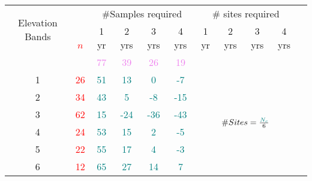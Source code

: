 \begin{table}\scriptsize
\centering
\begin{tabular}{cccccc|ccccc}
\toprule
\multirow{2}{1cm}{Elevation Bands}  & & \multicolumn{4}{c}{ \#Samples required} & \multicolumn{4}{c}{\# sites required} \\ \cline{3-10}\noalign{\smallskip}
 \multicolumn{1}{c}{}&\multirow{2}{.3cm}{\textcolor{red}{$n$}}& 1 yr   & 2 yrs  & 3 yrs     & 4 yrs   & 1 yr  & 2 yrs & 3 yrs  & 4 yrs \\ 
						&		           &\textcolor{violet}{77} &\textcolor{violet}{39} &\textcolor{violet}{26} &\textcolor{violet}{19}&&&&&\\ \midrule
1                                                                   &\textcolor{red}{26}&    \textcolor{teal}{51}   & \textcolor{teal}{13}       & \textcolor{teal}{0}        & \textcolor{teal}{-7}                         & \multicolumn{4}{c}{\multirow{6}{*}{\large$\#Sites = {\textcolor{teal}{N_c} \over 6}$}}  \\ 
2                                                                      &\textcolor{red}{34}& \textcolor{teal}{43} & \textcolor{teal}{5} & \textcolor{teal}{-8}     & \textcolor{teal}{-15}                                    &\multicolumn{4}{c}{}    \\ 
3                                                                      &\textcolor{red}{62}&  \textcolor{teal}{15} & \textcolor{teal}{-24}  & \textcolor{teal}{-36} &\textcolor{teal}{ -43}                                  & \multicolumn{4}{c}{}   \\
4                                                                      &\textcolor{red}{24}&  \textcolor{teal}{53} & \textcolor{teal}{15} & \textcolor{teal}{2}  & \textcolor{teal}{-5}                                      & \multicolumn{4}{c}{}   \\ 
5                                                                      &\textcolor{red}{22}&  \textcolor{teal}{55} & \textcolor{teal}{17} & \textcolor{teal}{4}  & \textcolor{teal}{-3}                                      &\multicolumn{4}{c}{}   \\ 
6                                                                     &\textcolor{red}{12}&  \textcolor{teal}{65} & \textcolor{teal}{27} & \textcolor{teal}{14}  & \textcolor{teal}{7}                                     & \multicolumn{4}{c}{}   \\ \bottomrule
\end{tabular}
\label{tab:TVapsenario}
\end{table}